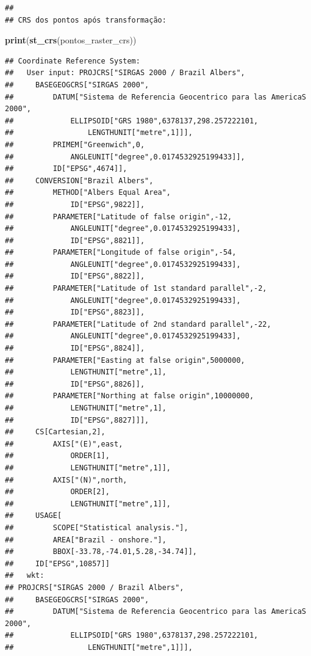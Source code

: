 \documentclass[
]{article}
\newenvironment{Shaded}{\begin{snugshade}}{\end{snugshade}}
\newcommand{\FunctionTok}[1]{\textcolor[rgb]{0.13,0.29,0.53}{\textbf{#1}}}
\newcommand{\NormalTok}[1]{#1}
\begin{document}
\begin{verbatim}
## 
## CRS dos pontos após transformação:
\end{verbatim}

\begin{Shaded}
\begin{Highlighting}[]
\FunctionTok{print}\NormalTok{(}\FunctionTok{st\_crs}\NormalTok{(pontos\_raster\_crs))}
\end{Highlighting}
\end{Shaded}

\begin{verbatim}
## Coordinate Reference System:
##   User input: PROJCRS["SIRGAS 2000 / Brazil Albers",
##     BASEGEOGCRS["SIRGAS 2000",
##         DATUM["Sistema de Referencia Geocentrico para las AmericaS 2000",
##             ELLIPSOID["GRS 1980",6378137,298.257222101,
##                 LENGTHUNIT["metre",1]]],
##         PRIMEM["Greenwich",0,
##             ANGLEUNIT["degree",0.0174532925199433]],
##         ID["EPSG",4674]],
##     CONVERSION["Brazil Albers",
##         METHOD["Albers Equal Area",
##             ID["EPSG",9822]],
##         PARAMETER["Latitude of false origin",-12,
##             ANGLEUNIT["degree",0.0174532925199433],
##             ID["EPSG",8821]],
##         PARAMETER["Longitude of false origin",-54,
##             ANGLEUNIT["degree",0.0174532925199433],
##             ID["EPSG",8822]],
##         PARAMETER["Latitude of 1st standard parallel",-2,
##             ANGLEUNIT["degree",0.0174532925199433],
##             ID["EPSG",8823]],
##         PARAMETER["Latitude of 2nd standard parallel",-22,
##             ANGLEUNIT["degree",0.0174532925199433],
##             ID["EPSG",8824]],
##         PARAMETER["Easting at false origin",5000000,
##             LENGTHUNIT["metre",1],
##             ID["EPSG",8826]],
##         PARAMETER["Northing at false origin",10000000,
##             LENGTHUNIT["metre",1],
##             ID["EPSG",8827]]],
##     CS[Cartesian,2],
##         AXIS["(E)",east,
##             ORDER[1],
##             LENGTHUNIT["metre",1]],
##         AXIS["(N)",north,
##             ORDER[2],
##             LENGTHUNIT["metre",1]],
##     USAGE[
##         SCOPE["Statistical analysis."],
##         AREA["Brazil - onshore."],
##         BBOX[-33.78,-74.01,5.28,-34.74]],
##     ID["EPSG",10857]] 
##   wkt:
## PROJCRS["SIRGAS 2000 / Brazil Albers",
##     BASEGEOGCRS["SIRGAS 2000",
##         DATUM["Sistema de Referencia Geocentrico para las AmericaS 2000",
##             ELLIPSOID["GRS 1980",6378137,298.257222101,
##                 LENGTHUNIT["metre",1]]],

\end{verbatim}
\end{document}
